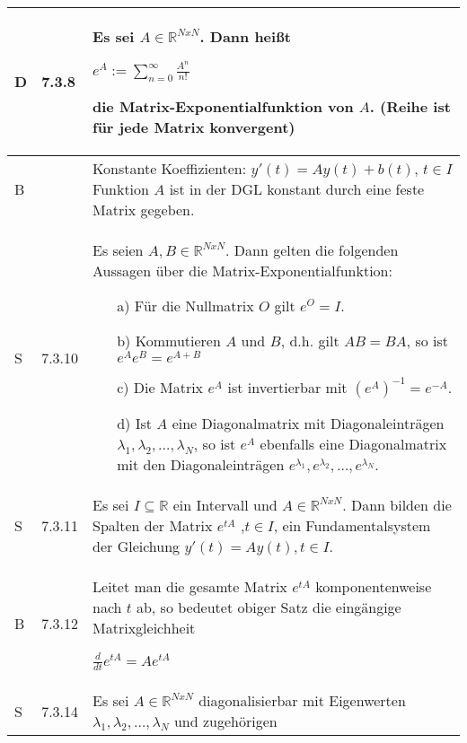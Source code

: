     \begin{longtable}{p{0.75cm} p{1cm} p{16cm}}
        \toprule

        D   & 7.3.8 &   Es sei $A\in \mathbb{R}^{NxN}$. Dann heißt \hfill \break
                        \centerline{$ e^A := \sum^{\infty}_{n=0} \frac{A^n}{n!} $}
                        die \textbf{Matrix-Exponentialfunktion} von $A$. \hfill \break
                        (Reihe ist für jede Matrix konvergent)\\
        \midrule
        B   &       &   Konstante Koeffizienten: $y'(t) = Ay(t) + b(t)$, $t \in I$ \hfill \break
                        Funktion $A$ ist in der DGL konstant durch eine feste Matrix gegeben. \\
        \midrule
        S   & 7.3.10&   Es seien $A,B \in \mathbb{R}^{NxN}$. Dann gelten die folgenden Aussagen über die Matrix-Exponentialfunktion:
                        \begin{itemize}[topsep=-0.5cm]
                            \item[a)] Für die Nullmatrix $O$ gilt $e^O = I$.
                            \item[b)] Kommutieren $A$ und $B$, d.h. gilt $AB = BA$, so ist $e^Ae^B = e^{A+B}$
                            \item[c)] Die Matrix $e^A$ ist invertierbar mit $(e^A)^{-1} = e^{-A}.$
                            \item[d)] Ist $A$ eine Diagonalmatrix mit Diagonaleinträgen $\lambda_1,\lambda_2, \dots,\lambda_N$, so ist
                                        $e^A$ ebenfalls eine Diagonalmatrix mit den Diagonaleinträgen $e^{\lambda_1},e^{\lambda_2},\dots,e^{\lambda_N}$.
                        \end{itemize} \vspace{-0cm} \\
        \midrule
        S   & 7.3.11&   Es sei $I \subseteq \mathbb{R}$ ein Intervall und $A \in \mathbb{R}^{NxN}$. Dann bilden die Spalten der Matrix $e^{tA}$
                        ,$t\in I$, ein Fundamentalsystem der Gleichung $y'(t) = Ay(t), t\in I$. \\
        \midrule
        B   & 7.3.12&   Leitet man die gesamte Matrix $e^{tA}$ komponentenweise nach $t$ ab, so bedeutet obiger Satz die eingängige Matrixgleichheit
                        \hfill \break \centerline{$ \frac{d}{dt}e^{tA} = A e^{tA} $} \\
        \midrule
        S   & 7.3.14&   Es sei $A \in \mathbb{R}^{NxN}$ diagonalisierbar mit Eigenwerten $\lambda_1, \lambda_2, \dots, \lambda_N$ und zugehörigen

\end{longtable}
